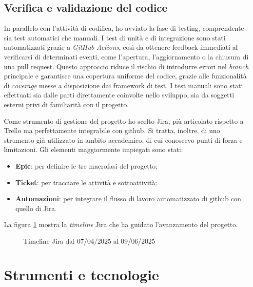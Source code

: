 \subsection{Verifica e validazione del codice}

\par In parallelo con l’attività di codifica, ho avviato la fase di testing, comprendente sia test automatici che manuali. I test di unità e di integrazione sono stati automatizzati grazie a \textit{GitHub Actions}, così da ottenere feedback immediati al verificarsi di determinati eventi, come l’apertura, l’aggiornamento o la chiusura di una \gls{pull request}. Questo approccio riduce il rischio di introdurre errori nel \textit{branch} principale e garantisce una copertura uniforme del codice, grazie alle funzionalità di \textit{coverage} messe a disposizione dai \gls{framework} di test. I test manuali sono stati effettuati sia dalle parti direttamente coinvolte nello sviluppo, sia da soggetti esterni privi di familiarità con il progetto.

\vspace{10pt}
\par\noindent Come strumento di gestione del progetto ho scelto Jira, più articolato rispetto a Trello ma perfettamente integrabile con \gls{github}. Si tratta, inoltre, di uno strumento già utilizzato in ambito accademico, di cui conoscevo punti di forza e limitazioni. Gli elementi maggiormente impiegati sono stati:
\begin{itemize}
  \item \textbf{Epic}: per definire le tre macrofasi del progetto;
  \item \textbf{Ticket}: per tracciare le attività e sottoattività;
  \item \textbf{Automazioni}: per integrare il flusso di lavoro automatizzato di \gls{github} con quello di Jira.
\end{itemize}

\vspace{5pt}
\par\noindent La figura \ref{fig:timeline_jira} mostra la \textit{timeline} Jira che ha guidato l’avanzamento del progetto.

\begin{figure}[H]
  \centering 
  \caption{Timeline Jira dal 07/04/2025 al 09/06/2025}
  \label{fig:timeline_jira}
\end{figure}

\section{Strumenti e tecnologie}
\label{sec:strumenti-tecnologie}

